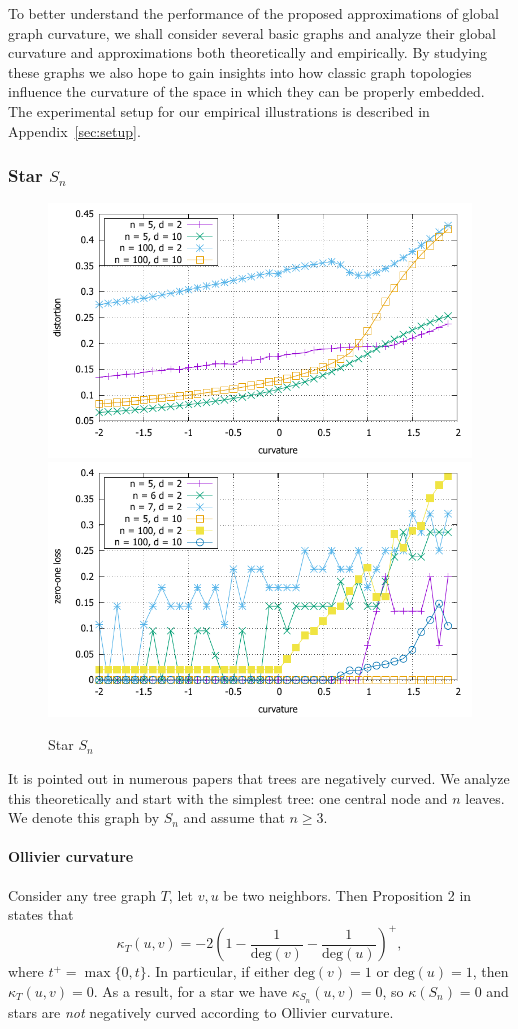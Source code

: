 \documentclass{article} %
\begin{document}
To better understand the performance of the proposed approximations of global graph curvature,
we shall consider several basic graphs and analyze their global curvature and approximations both theoretically and empirically. By studying these graphs we also hope to gain insights into how classic graph topologies influence the curvature of the space in which they can be properly embedded. The experimental setup for our empirical illustrations is described in Appendix~\ref{sec:setup}.

\subsubsection{Star $S_n$}\label{sec:S_n}

\begin{figure}
    \centering
    \includegraphics[width = 0.49 \textwidth]{star_distortion.pdf}
    \includegraphics[width = 0.49 \textwidth]{star_zero_one.pdf}
    \caption{Star $S_n$}
    \label{fig:star}
\end{figure}

It is pointed out in numerous papers that trees are negatively curved. 
We analyze this theoretically and start with the simplest tree: one central node and $n$ leaves. We denote this graph by $S_n$ and assume that $n \ge 3$.

\paragraph{Ollivier curvature} 
Consider any tree graph $T$, let $v, u$ be two neighbors. Then Proposition 2 in~\citep{jost2014ollivier} states that
\begin{equation}\label{eq:ollivier_tree}
	\kappa_T(u,v) = -2\left(1 - \frac{1}{\mathrm{deg}(v)} - \frac{1}{\mathrm{deg}(u)}\right)^+, 
\end{equation}
where $t^+ = \max\{0,t\}$. In particular, if either $\mathrm{deg}(v) = 1$ or $\mathrm{deg}(u) = 1$, then $\kappa_T(u,v) = 0$.  As a result, for a star we have $\kappa_{S_n}(u,v) = 0$, so $\kappa(S_n) = 0$ and stars are \textit{not} negatively curved according to Ollivier curvature.
\end{document}
